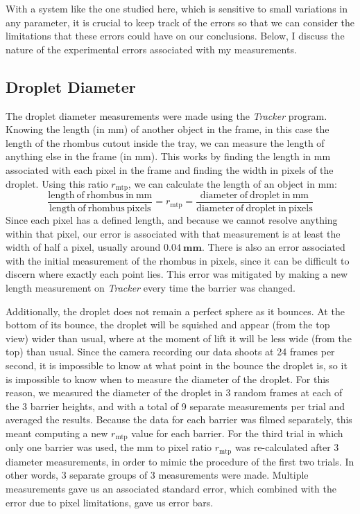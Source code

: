     With a system like the one studied here, which is sensitive to small variations in any parameter, it is crucial to keep track of the errors so that we can consider the limitations that these errors could have on our conclusions. Below, I discuss the nature of the experimental errors associated with my measurements.
       
    \subsection{Droplet Diameter}
    The droplet diameter measurements were made using the \textit{Tracker} program. Knowing the length (in mm) of another object in the frame, in this case the length of the rhombus cutout inside the tray, we can measure the length of anything else in the frame (in mm). This works by finding the length in mm associated with each pixel in the frame and finding the width in pixels of the droplet. Using this ratio $r_\mathrm{mtp}$, we can calculate the length of an object in mm:   
$$ 
\frac{\mathrm{length~of~rhombus~in~mm}}{\mathrm{length~of~rhombus~pixels}}= r_\mathrm{mtp} = \frac{\mathrm{diameter~of~droplet~in~mm}}{\mathrm{diameter~of~droplet~in~pixels}} 
$$ 
Since each pixel has a defined length, and because we cannot resolve anything within that pixel, our error is associated with that measurement is at least the width of half a pixel, usually around $\mathbf{0.04~\mathrm{\textbf{mm}}}$. There is also an error associated with the initial measurement of the rhombus in pixels, since it can be difficult to discern where exactly each point lies. This error was mitigated by making a new length measurement on \textit{Tracker} every time the barrier was changed. 

Additionally, the droplet does not remain a perfect sphere as it bounces. At the bottom of its bounce, the droplet will be squished and appear (from the top view) wider than usual, where at the moment of lift it will be less wide (from the top) than usual. Since the camera recording our data shoots at 24 frames per second, it is impossible to know at what point in the bounce the droplet is, so it is impossible to know when to measure the diameter of the droplet. For this reason, we measured the diameter of the droplet in 3 random frames at each of the 3 barrier heights, and with a total of 9 separate measurements per trial and averaged the results. Because the data for each barrier was filmed separately, this meant computing a new $r_\mathrm{mtp}$ value for each barrier. For the third trial in which only one barrier was used, the mm to pixel ratio $r_\mathrm{mtp}$ was re-calculated after 3 diameter measurements, in order to mimic the procedure of the first two trials. In other words, 3 separate groups  of 3 measurements were made. Multiple measurements gave us an associated standard error, which combined with the error due to pixel limitations, gave us error bars. 

